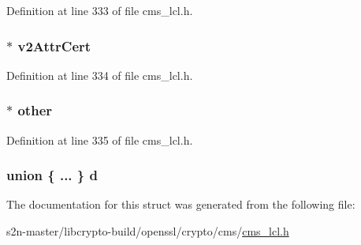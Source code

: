 Definition at line 333 of file cms\+\_\+lcl.\+h.

\subsubsection[{\texorpdfstring{v2\+Attr\+Cert}{v2AttrCert}}]{$\ast$ v2\+Attr\+Cert}\hypertarget{struct_c_m_s___certificate_choices_a16f0568e1d320b43b8b46e6271bf9ef4}{}\label{struct_c_m_s___certificate_choices_a16f0568e1d320b43b8b46e6271bf9ef4}


Definition at line 334 of file cms\+\_\+lcl.\+h.

\subsubsection[{\texorpdfstring{other}{other}}]{$\ast$ other}\hypertarget{struct_c_m_s___certificate_choices_aff6e4aa8f7b4459b6977900ca9716f79}{}\label{struct_c_m_s___certificate_choices_aff6e4aa8f7b4459b6977900ca9716f79}


Definition at line 335 of file cms\+\_\+lcl.\+h.

\subsubsection[{\texorpdfstring{d}{d}}]{\setlength{\rightskip}{0pt plus 5cm}union \{ ... \}   d}\hypertarget{struct_c_m_s___certificate_choices_ae8dc97c208ec1907c0d30920d1cb3dcb}{}\label{struct_c_m_s___certificate_choices_ae8dc97c208ec1907c0d30920d1cb3dcb}


The documentation for this struct was generated from the following file\+:\begin{DoxyCompactItemize}
\item 
s2n-\/master/libcrypto-\/build/openssl/crypto/cms/\hyperlink{cms__lcl_8h}{cms\+\_\+lcl.\+h}\end{DoxyCompactItemize}
